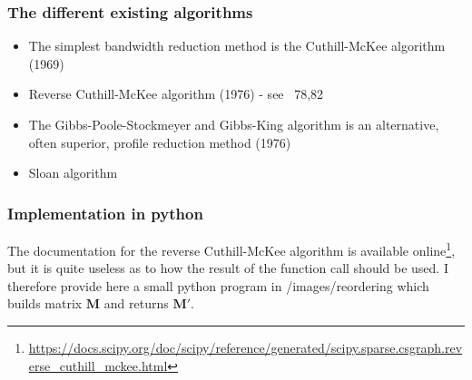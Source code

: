 \subsubsection*{The different existing algorithms \label{ss:reordering}}

\begin{itemize}
\item The simplest bandwidth reduction method is the Cuthill-McKee algorithm (1969) \cite{cumc69}

\item Reverse Cuthill-McKee algorithm (1976) \cite{gibbs76} - see \stone~78,82

\item The Gibbs-Poole-Stockmeyer and Gibbs-King algorithm is
an alternative, often superior, profile reduction method (1976) \cite{gips76}


\item Sloan algorithm \cite{sloan86,sloan89}

\end{itemize}



\subsubsection*{Implementation in python}

The documentation for the reverse Cuthill-McKee algorithm is available online\footnote{
\url{https://docs.scipy.org/doc/scipy/reference/generated/scipy.sparse.csgraph.reverse_cuthill_mckee.html}},
but it is quite useless as to how the result of the function call should be used. 
I therefore provide here a small python program in /images/reordering which builds
matrix ${\bm M}$ and returns ${\bm M}'$. 

